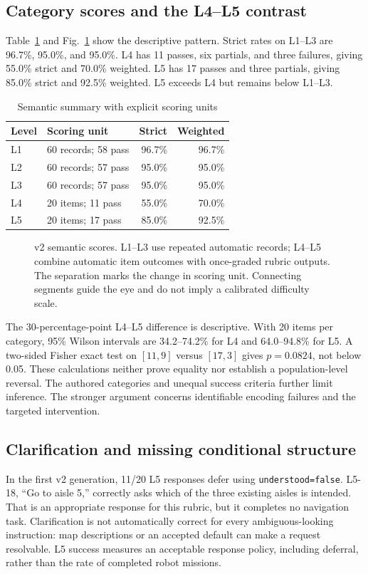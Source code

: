\documentclass[journal]{IEEEtran}
\newcommand{\field}[1]{\texttt{#1}}
\begin{document}
\subsection{Category scores and the L4--L5 contrast}
Table~\ref{tab:semantic} and Fig.~\ref{fig:reliability} show the descriptive pattern. Strict rates on L1--L3 are 96.7\%, 95.0\%, and 95.0\%. L4 has 11 passes, six partials, and three failures, giving 55.0\% strict and 70.0\% weighted. L5 has 17 passes and three partials, giving 85.0\% strict and 92.5\% weighted. L5 exceeds L4 but remains below L1--L3.

\begin{table}[t]
\caption{Semantic summary with explicit scoring units}
\label{tab:semantic}\centering\small
\begin{tabular}{@{}llrr@{}}
\toprule
Level & Scoring unit & Strict & Weighted\\\midrule
L1 & 60 records; 58 pass & 96.7\% & 96.7\%\\
L2 & 60 records; 57 pass & 95.0\% & 95.0\%\\
L3 & 60 records; 57 pass & 95.0\% & 95.0\%\\
L4 & 20 items; 11 pass & 55.0\% & 70.0\%\\
L5 & 20 items; 17 pass & 85.0\% & 92.5\%\\
\bottomrule
\end{tabular}
\end{table}

\begin{figure}[t]
\centering
\caption{v2 semantic scores. L1--L3 use repeated automatic records; L4--L5 combine automatic item outcomes with once-graded rubric outputs. The separation marks the change in scoring unit. Connecting segments guide the eye and do not imply a calibrated difficulty scale.}
\label{fig:reliability}
\end{figure}

The 30-percentage-point L4--L5 difference is descriptive. With 20 items per category, 95\% Wilson intervals are 34.2--74.2\% for L4 and 64.0--94.8\% for L5. A two-sided Fisher exact test on $[11,9]$ versus $[17,3]$ gives $p=0.0824$, not below 0.05. These calculations neither prove equality nor establish a population-level reversal. The authored categories and unequal success criteria further limit inference. The stronger argument concerns identifiable encoding failures and the targeted intervention.

\subsection{Clarification and missing conditional structure}
In the first v2 generation, 11/20 L5 responses defer using \field{understood=false}. L5-18, ``Go to aisle 5,'' correctly asks which of the three existing aisles is intended. That is an appropriate response for this rubric, but it completes no navigation task. Clarification is not automatically correct for every ambiguous-looking instruction: map descriptions or an accepted default can make a request resolvable. L5 success measures an acceptable response policy, including deferral, rather than the rate of completed robot missions.
\end{document}
